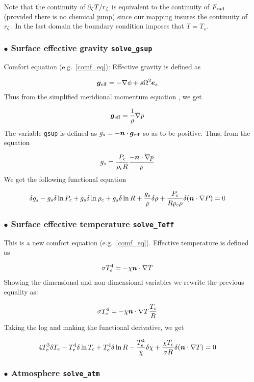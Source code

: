 Note that the continuity of $\partial_\zeta T/r_\zeta$ is equivalent to the
continuity of $F_{\rm rad}$ (provided there is no chemical jump) since our
mapping insures the continuity of $r_\zeta$. In the last domain the boundary
condition imposes that $T=T_s$.





\subsubsection{$\bullet$ \bf Surface effective gravity {\tt solve\_gsup}}

Comfort equation (e.g.~\ref{comf_eq}): Effective gravity is defined as

\[ \vg_{\rm eff} = -\nabla\phi+s\Omega^2\es\]
Thus from the simplified meridional momentum equation , we get

\[ \vg_{\rm eff} = \frac{1}{\rho}\nabla p\]
The variable {\tt gsup} is defined as $g_s=-\vn\cdot\vg_{\rm eff}$
so as to be positive. Thus, from the equation

\[ g_s=\frac{P_c}{\rho_cR}\frac{-\vn\cdot\nabla p}{\rho}\]
We get the following functional equation

\begin{equation}
\delta g_s -g_s\delta\ln P_c +g_s\delta\ln\rho_c+g_s\delta\ln R + \frac{g_s}{\rho}\delta\rho+
\frac{P_c}{R\rho_c\rho}\delta(\vn\cdot\nabla P) = 0
\end{equation}

\subsubsection{$\bullet$ \bf Surface effective temperature {\tt solve\_Teff}}

This is a new comfort equation (e.g.~\ref{comf_eq}). Effective temperature is defined as

\[ \sigma T_e^4 = -\khi\vn\cdot\na T\]
Showing the dimensional and non-dimensional variables we rewrite the
previous equality as:

\[ \sigma T_e^4 = -\khi\vn\cdot\na T \frac{T_c}{R}\]
Taking the log and making the functional derivative, we get

\begin{equation}
4T_e^3\delta T_e -T_e^4\delta\ln T_c + T_e^4\delta\ln R -\frac{T_e^4}{\khi}\delta\khi + \frac{\khi T_c}{\sigma
R}\delta(\vn\cdot\nabla T) = 0
\end{equation}

\subsubsection{$\bullet$ \bf Atmosphere {\tt solve\_atm}}

